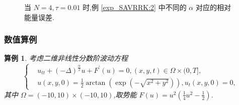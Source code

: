\documentclass[aspectratio=169]{beamer}
\newtheorem{myexample}{算例}[section] %
\numberwithin{theorem}{section} %
\numberwithin{equation}{section}%
\numberwithin{figure}{section}%
\numberwithin{table}{section}%
\begin{document}
\begin{frame}%
	\begin{figure}[H]
		\begin{center}
		\caption{当 $N=4, \tau=0.01$ 时,例 \ref{exp_SAVRRK:2} 中不同的 $\alpha$ 对应的相对能量误差.}
		\label{fig_SAVRRK:2-4}
		\end{center}
		\end{figure}
\end{frame}
\begin{frame}\frametitle{数值算例}
	\begin{myexample}\label{exp_SAVRRK:3}
		考虑二维非线性分数阶波动方程\cite{wangUnconditionalEnergyDissipation2021} 
		\begin{equation}
		\begin{cases}
		& u_{t t}+(-\Delta)^{\frac{\alpha}{2}} u+F^{\prime}(u)=0,(x, y, t) \in \Omega \times(0, T],\\
		& u(x, y, 0)=\frac{1}{2} \arctan \left(\exp \left(-\sqrt{x^2+y^2}\right)\right), u_t(x, y, 0)=0,
		\end{cases}
		\end{equation}
		其中 $\Omega=(-10,10) \times(-10,10)$,取势能 $F(u)=u^2\left(\frac{1}{4} u^2-\frac{1}{2}\right)$.
		\end{myexample}
\end{frame}
\end{document}
